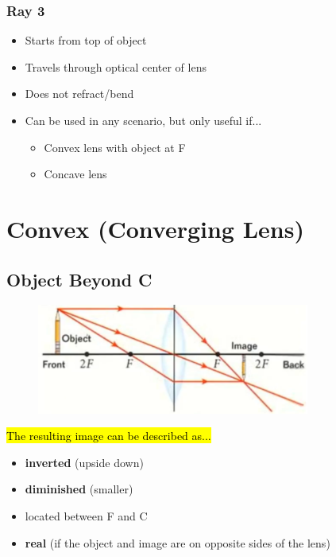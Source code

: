 \documentclass[a4paper,12pt]{article}
\begin{document}
\subsubsection{Ray 3}
\begin{itemize}
    \item{Starts from top of object}
    \item{Travels through optical center of lens}
    \item{Does not refract/bend}
    \item{
        Can be used in any scenario, but only useful if...
        \begin{itemize}
            \item{Convex lens with object at F}
            \item{Concave lens}
        \end{itemize}
    }
\end{itemize}

\pagebreak
\section{Convex (Converging Lens)}

\subsection{Object Beyond C}
\begin{figure}[H]
    \centering
    \includegraphics[width=0.8\textwidth]{convex-beyondC}
\end{figure}

\hl{The resulting image can be described as...}
\begin{itemize}
    \item{\textbf{inverted} (upside down)}
    \item{\textbf{diminished} (smaller)}
    \item{located between F and C}
    \item{\textbf{real} (if the object and image are on opposite sides of the lens)}
\end{itemize}
\end{document}
